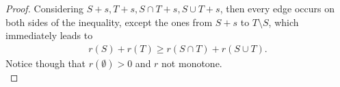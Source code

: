 \begin{proof}
    Considering $S+s,T+s,S\cap T+s, S \cup T+s$, then every edge occurs on both sides of the inequality,
    \textcolor{rgb, 255:red, 21; green, 165; blue, 30 }{except the ones from $S+s$ to $T \setminus S$}, which immediately leads to
    \begin{align*}
        r(S) + r(T) \geq r(S \cap T) + r(S \cup T).
    \end{align*}
    Notice though that $r(\emptyset) > 0$ and $r$ not monotone.
    \\
    \begin{minipage}{\textwidth}
        \centering
        \begin{tikzpicture}[x=0.75pt,y=0.75pt,yscale=-1,xscale=1]


\end{tikzpicture}
\end{minipage}
\end{proof}
